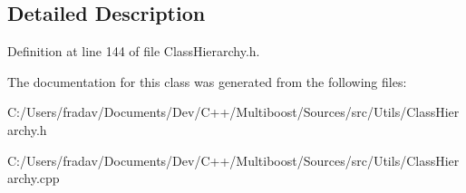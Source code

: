 \subsection{Detailed Description}


Definition at line 144 of file Class\-Hierarchy.\-h.



The documentation for this class was generated from the following files\-:\begin{DoxyCompactItemize}
\item 
C\-:/\-Users/fradav/\-Documents/\-Dev/\-C++/\-Multiboost/\-Sources/src/\-Utils/Class\-Hierarchy.\-h\item 
C\-:/\-Users/fradav/\-Documents/\-Dev/\-C++/\-Multiboost/\-Sources/src/\-Utils/Class\-Hierarchy.\-cpp\end{DoxyCompactItemize}
